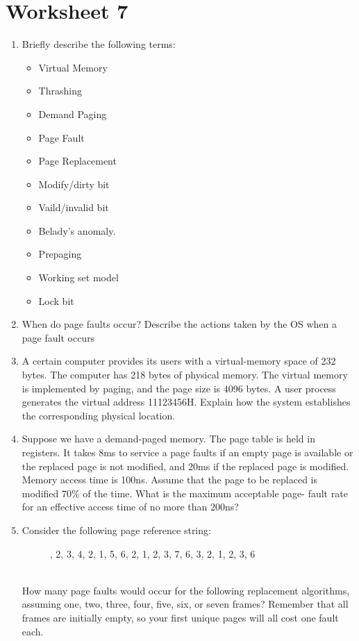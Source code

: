 \documentclass{article}
\begin{document}
	\section{Worksheet 7}
	\begin{enumerate}
		\item Briefly describe the following terms:
		\begin{multicols}{2}
			\begin{itemize}
				\item Virtual Memory
				\item Thrashing
				\item Demand Paging
				\item Page Fault
				\item Page Replacement
				\item Modify/dirty bit
				\item Vaild/invalid bit
				\item Belady's anomaly.
				\item Prepaging
				\item Working set model
				\item Lock bit
			\end{itemize}
		\end{multicols}
		\item When do page faults occur? Describe the actions taken by the OS when a page fault occurs
		\item A certain computer provides its users with a virtual-memory space of 232 bytes. The computer has 218 bytes of physical memory. The virtual memory is implemented by paging, and the page size is 4096 bytes. A user process generates the virtual address 11123456H. Explain how the system establishes the corresponding physical location.
		\item Suppose we have a demand-paged memory. The page table is held in registers. It takes 8ms to service a page faults if an empty page is available or the replaced page is not modified, and 20ms if the replaced page is modified. Memory access time is 100ns. Assume that the page to be replaced is modified 70\% of the time. What is the maximum acceptable page- fault rate for an effective access time of no more than 200ns?
		\item Consider the following page reference string:
		\begin{figure*}[h]
			, 2, 3, 4, 2, 1, 5, 6, 2, 1, 2, 3, 7, 6, 3, 2, 1, 2, 3, 6
		\end{figure*}\\
		How many page faults would occur for the following replacement algorithms, assuming one, two, three, four, five, six, or seven frames? Remember that all frames are initially empty, so your first unique pages will all cost one fault each.

\end{enumerate}
\end{document}
